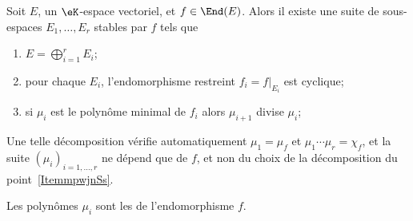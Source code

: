 \begin{theorem}        \label{THOooDOWUooOzxzxm}
	Soit \( E\), un \( \eK\)-espace vectoriel, et \( f\in \End(E)\). Alors il existe une suite de sous-espaces \( E_1,\ldots, E_r\) stables par \( f\) tels que
	\begin{enumerate}
		\item   \label{ItemmpwjnSs}
		      \( E=\bigoplus_{i=1}^rE_i\);
		\item
		      pour chaque \( E_i\), l'endomorphisme restreint \( f_i=f|_{E_i}\) est cyclique;
		\item
		      si \( \mu_i\) est le polynôme minimal de \( f_i\) alors \( \mu_{i+1}\) divise \( \mu_i\);
	\end{enumerate}
	Une telle décomposition vérifie automatiquement \( \mu_1=\mu_f\) et \( \mu_1\cdots \mu_r=\chi_f\), et la suite \( (\mu_i)_{i=1,\ldots, r}\) ne dépend que de \( f\), et non du choix de la décomposition du point~\ref{ItemmpwjnSs}.
\end{theorem}

Les polynômes \( \mu_i\) sont les  de l'endomorphisme \( f\).

